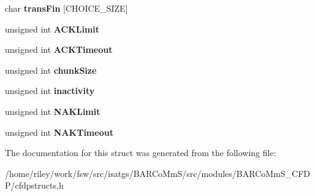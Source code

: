 \begin{DoxyCompactItemize}
\item 
char {\bfseries trans\+Fin} \mbox{[}C\+H\+O\+I\+C\+E\+\_\+\+S\+I\+ZE\mbox{]}\hypertarget{struct_m_i_b_a5c9ded36f5b0cbb804de34459e2b6b2b}{}\label{struct_m_i_b_a5c9ded36f5b0cbb804de34459e2b6b2b}

\item 
unsigned int {\bfseries A\+C\+K\+Limit}\hypertarget{struct_m_i_b_a1c05578ed1122584ec51b7174a25bbf5}{}\label{struct_m_i_b_a1c05578ed1122584ec51b7174a25bbf5}

\item 
unsigned int {\bfseries A\+C\+K\+Timeout}\hypertarget{struct_m_i_b_a5def7362f799cdd5727896fa8f61863b}{}\label{struct_m_i_b_a5def7362f799cdd5727896fa8f61863b}

\item 
unsigned int {\bfseries chunk\+Size}\hypertarget{struct_m_i_b_a01015d449aaabad31048f69b0796c9d7}{}\label{struct_m_i_b_a01015d449aaabad31048f69b0796c9d7}

\item 
unsigned int {\bfseries inactivity}\hypertarget{struct_m_i_b_ad21ba2f674f99bb3955576471def1dff}{}\label{struct_m_i_b_ad21ba2f674f99bb3955576471def1dff}

\item 
unsigned int {\bfseries N\+A\+K\+Limit}\hypertarget{struct_m_i_b_adab59c56faca2ea5db7aaa3855beb701}{}\label{struct_m_i_b_adab59c56faca2ea5db7aaa3855beb701}

\item 
unsigned int {\bfseries N\+A\+K\+Timeout}\hypertarget{struct_m_i_b_a7c95cca4afcb24856aafa70a3fb6ef81}{}\label{struct_m_i_b_a7c95cca4afcb24856aafa70a3fb6ef81}

\end{DoxyCompactItemize}


The documentation for this struct was generated from the following file\+:\begin{DoxyCompactItemize}
\item 
/home/riley/work/fsw/src/isatgs/\+B\+A\+R\+Co\+Mm\+S/src/modules/\+B\+A\+R\+Co\+Mm\+S\+\_\+\+C\+F\+D\+P/cfdpstructs.\+h\end{DoxyCompactItemize}
